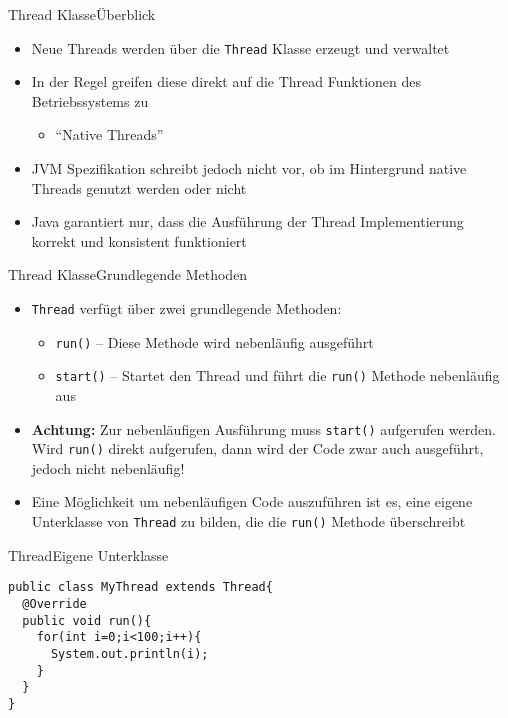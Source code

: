 \begin{frame}{Thread Klasse}{Überblick}
    \begin{itemize}
        \item Neue Threads werden über die \texttt{Thread} Klasse erzeugt und verwaltet
        \item In der Regel greifen diese direkt auf die Thread Funktionen des Betriebssystems zu
        \begin{itemize}
            \item "`Native Threads"'
        \end{itemize}
        \item JVM Spezifikation schreibt jedoch nicht vor, ob im Hintergrund native Threads genutzt werden oder nicht
        \item Java garantiert nur, dass die Ausführung der Thread Implementierung korrekt und konsistent funktioniert
    \end{itemize}
\end{frame}

\begin{frame}{Thread Klasse}{Grundlegende Methoden}
    \begin{itemize}
        \item \texttt{Thread} verfügt über zwei grundlegende Methoden:
        \begin{itemize}
            \item \texttt{run()} -- Diese Methode wird nebenläufig ausgeführt
            \item \texttt{start()} -- Startet den Thread und führt die \texttt{run()} Methode nebenläufig aus
        \end{itemize}
        \item \textbf{Achtung:} Zur nebenläufigen Ausführung muss \texttt{start()} aufgerufen werden. Wird \texttt{run()} direkt aufgerufen, dann wird der Code zwar auch ausgeführt, jedoch nicht nebenläufig!
        \item Eine Möglichkeit um nebenläufigen Code auszuführen ist es, eine eigene Unterklasse von \texttt{Thread} zu bilden, die die \texttt{run()} Methode überschreibt
    \end{itemize}
\end{frame}

\begin{frame}[fragile]{Thread}{Eigene Unterklasse}
\lstset{style=java}
\begin{lstlisting}
public class MyThread extends Thread{
  @Override
  public void run(){
    for(int i=0;i<100;i++){
      System.out.println(i);
    }
  }
}
\end{lstlisting}
\end{frame}

